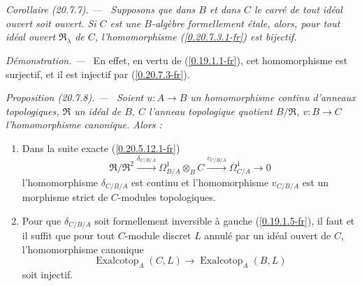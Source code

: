 \documentclass[10pt,oneside]{book}
\makeatletter
\newcommand{\sref}[1]{(\ref{#1})}
\newcommand{\setmanualcurrentlabel}[1]{\def\@currentlabel{#1}}
\newenvironment{proposition}[1][]{%
  \setmanualcurrentlabel{#1}\par\medskip\noindent\itshape Proposition (#1). ---\ }{\par}
\newenvironment{corollary}[1][]{%
  \setmanualcurrentlabel{#1}\par\medskip\noindent\itshape Corollaire (#1). ---\ }{\par}
\newenvironment{proof}{%
  \par\medskip\noindent\textit{Démonstration. ---\ }}{\par}
\makeatother
\begin{document}
\begin{corollary}[20.7.7]
\label{0.20.7.7-fr}
Supposons que dans $B$ et dans $C$ le carré de tout idéal ouvert soit ouvert.
Si $C$ est une $B$-algèbre formellement étale, alors, pour tout idéal ouvert
$\mathfrak{R}_\lambda$ de $C$, l'homomorphisme \sref{0.20.7.3.1-fr} est
bijectif.
\end{corollary}

\begin{proof}
En effet, en vertu de \sref{0.19.1.1-fr}, cet homomorphisme est surjectif, et
il est injectif par \sref{0.20.7.3-fr}.
\end{proof}

\begin{proposition}[20.7.8]
\label{0.20.7.8-fr}
Soient $u:A\to B$ un homomorphisme continu d'anneaux topologiques,
$\mathfrak{R}$ un idéal de $B$, $C$ l'anneau topologique quotient
$B/\mathfrak{R}$, $v:B\to C$ l'homomorphisme canonique. Alors :
\begin{enumerate}
  \item[\rm(i)] Dans la suite exacte \sref{0.20.5.12.1-fr}
\[
  \mathfrak{R}/\mathfrak{R}^2\xrightarrow{\delta_{C/B/A}}
  \Omega^1_{B/A}\otimes_B C\xrightarrow{v_{C/B/A}}\Omega^1_{C/A}\to0
\]
l'homomorphisme $\delta_{C/B/A}$ est continu et l'homomorphisme $v_{C/B/A}$
est un morphisme strict de $C$-modules topologiques.
  \item[\rm(ii)] Pour que $\delta_{C/B/A}$ soit formellement inversible à
gauche \sref{0.19.1.5-fr}, il faut et il suffit que pour tout $C$-module
discret $L$ annulé par un idéal ouvert de $C$, l'homomorphisme canonique
\begin{equation}
\tag{20.7.8.1}
\label{0.20.7.8.1-fr}
  \operatorname{Exalcotop}_A(C,L)\to\operatorname{Exalcotop}_A(B,L)
\end{equation}
soit injectif.
\end{enumerate}
\end{proposition}
\end{document}
